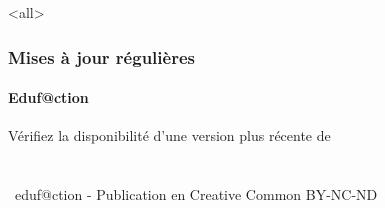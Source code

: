 \documentclass[ignorenonframetext,allowframebreaks,aspectratio=169,t,9pt, xcolor=table]{beamer}
\begin{document}
\mode<all>{}
\begin{frame}
\frametitle{Mises à jour régulières}
\framesubtitle{Eduf@ction~\umaila}
{\begin{center} 
{Vérifiez la disponibilité d'une version plus récente de} \\
{ }   \\ 
{{\huge\ccbyncndeu}}  \\  
{\the\year~eduf@ction - Publication en Creative Common BY-NC-ND }    \\  %
{\safeqrcode[padding]{\GITfilename}}  
\end{center} }
\end{frame}
\end{document}
